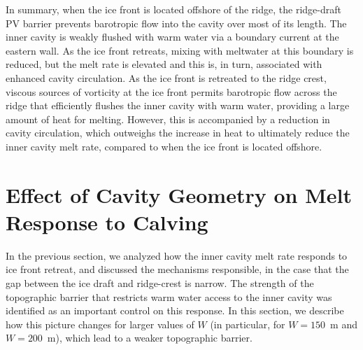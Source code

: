 \documentclass[draft]{agujournal2019}
\begin{document}
In summary, when the ice front is located offshore of the ridge, the ridge-draft PV barrier prevents barotropic flow into the cavity over most of its length. The inner cavity is weakly flushed with warm water via a boundary current at the eastern wall. As the ice front retreats, mixing with meltwater at this boundary is reduced, but the melt rate is elevated and this is, in turn, associated with enhanced cavity circulation. As the ice front is retreated to the ridge crest, viscous sources of vorticity at the ice front permits barotropic flow across the ridge that efficiently flushes the inner cavity with warm water, providing a large amount of heat for melting. However, this is accompanied by a reduction in cavity circulation, which outweighs the increase in heat to ultimately reduce the inner cavity melt rate, compared to when the ice front is located offshore.


\section{Effect of Cavity Geometry on Melt Response to Calving}\label{S:Results:H}
In the previous section, we analyzed how the inner cavity melt rate responds to ice front retreat, and discussed the mechanisms responsible, in the case that the gap between the ice draft and ridge-crest is narrow. The strength of the topographic barrier that restricts warm water access to the inner cavity was identified as an important control on this response. In this section, we describe how this picture changes for larger values of $W$ (in particular, for $W=150$~m and $W=200$~m), which lead to a weaker topographic barrier.

\end{document}
